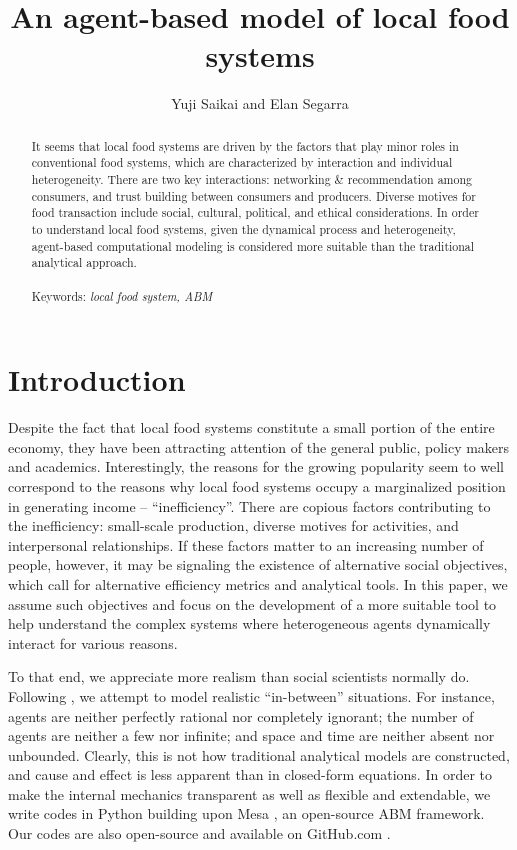 \documentclass[11pt, oneside]{article}
\title{An agent-based model of local food systems}
\author{Yuji Saikai and Elan Segarra}
\begin{document}
\maketitle
\thispagestyle{empty} %
\vspace{5mm}

\begin{abstract}
\noindent 
It seems that local food systems are driven by the factors that play minor roles in conventional food systems, which are characterized by interaction and individual heterogeneity. There are two key interactions: networking \& recommendation among consumers, and trust building between consumers and producers. Diverse motives for food transaction include social, cultural, political, and ethical considerations. In order to understand local food systems, given the dynamical process and heterogeneity, agent-based computational modeling is considered more suitable than the traditional analytical approach.\\\\
\noindent
Keywords: \textit{local food system, ABM}
\end{abstract}

\pagebreak

\tableofcontents
\pagebreak

\section{Introduction}
Despite the fact that local food systems constitute a small portion of the entire economy, they have been attracting  attention of the general public, policy makers and academics. Interestingly, the reasons for the growing popularity seem to well correspond to the reasons why local food systems occupy a marginalized position in generating income -- ``inefficiency''. There are copious factors contributing to the inefficiency: small-scale production, diverse motives for activities, and interpersonal relationships. If these factors matter to an increasing number of people, however, it may be signaling the existence of alternative social objectives, which call for alternative efficiency metrics and analytical tools. In this paper, we assume such objectives and focus on the development of a more suitable tool to help understand the complex systems where heterogeneous agents dynamically interact for various reasons.

To that end, we appreciate more realism than social scientists normally do. Following \textcite{Miller2009}, we attempt to model realistic ``in-between'' situations. For instance, agents are neither perfectly rational nor completely ignorant; the number of agents are neither a few nor infinite; and space and time are neither absent nor unbounded. Clearly, this is not how traditional analytical models are constructed, and cause and effect is less apparent than in closed-form equations. In order to make the internal mechanics transparent as well as flexible and extendable, we write codes in Python building upon Mesa \parencite{Mesa2016}, an open-source ABM framework. Our codes are also open-source and available on GitHub.com \parencite{Saikai2016}.
\end{document}

